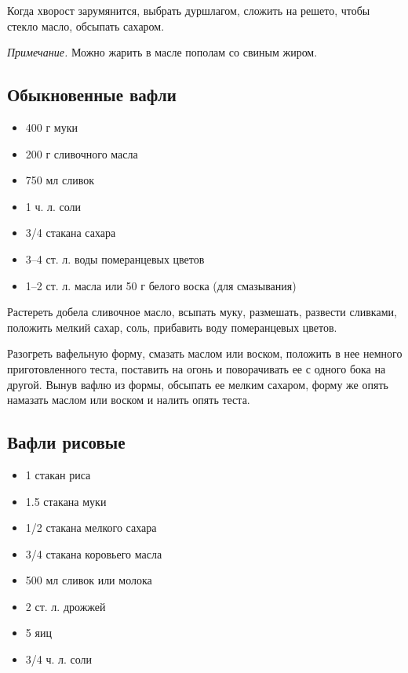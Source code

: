 Когда хворост зарумянится, выбрать дуршлагом, сложить на решето, чтобы стекло масло, обсыпать сахаром.

\emph{Примечание.} Можно жарить в масле пополам со свиным жиром.

\subsection{Обыкновенные вафли}\label{sec:rec35}

\begin{itemize}
	\item 400 г муки 
    \item 200 г сливочного масла 
    \item 750 мл сливок
    \item 1 ч. л. соли
    \item 3/4 стакана сахара
    \item 3–4 ст. л. воды померанцевых цветов
    \item 1–2 ст. л. масла или 50 г белого воска (для смазывания)
\end{itemize}

Растереть добела сливочное масло, всыпать муку, размешать, развести сливками, положить мелкий сахар, соль, прибавить воду померанцевых цветов.

Разогреть вафельную форму, смазать маслом или воском, положить в нее немного приготовленного теста, поставить на огонь и поворачивать ее с одного бока на другой. Вынув вафлю из формы, обсыпать ее мелким сахаром, форму же опять намазать маслом или воском и налить опять теста.

\subsection{Вафли рисовые}

\begin{itemize}
	\item 1 стакан риса
    \item 1.5 стакана муки 
    \item 1/2 стакана мелкого сахара
    \item 3/4 стакана коровьего масла
    \item 500 мл сливок или молока 
    \item 2 ст. л. дрожжей 
    \item 5 яиц
    \item 3/4 ч. л. соли
\end{itemize}

